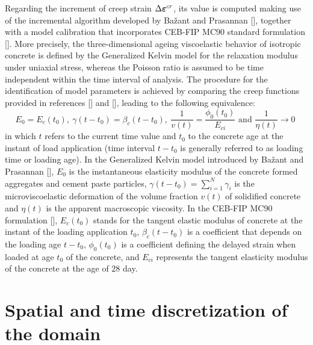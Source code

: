 \documentclass[a4paper,fleqn]{cas-sc}
\begin{document}
Regarding the increment of creep strain $\Delta \boldsymbol{\varepsilon}^{cr}$, its value is computed making use of the incremental algorithm developed by Bažant and Prasannan [], together with a model calibration that incorporates CEB-FIP MC90 standard formulation []. More precisely, the three-dimensional ageing viscoelastic behavior of isotropic concrete is defined by the Generalized Kelvin model for the relaxation modulus under uniaxial stress, whereas the Poisson ratio is assumed to be time independent within the time interval of analysis. The procedure for the identification of model parameters is achieved by comparing the creep functions provided in references [] and [], leading to the following equivalence:
\begin{equation} \label{eq:11}
	E_0 = E_c(t_0),~ \gamma(t-t_0)=\beta_c(t-t_0),~ \frac{1}{v(t)} = \frac{\phi_0(t_0)}{E_{ci}} \text{  and  } \frac{1}{\eta(t)} \to 0 \;
\end{equation}
in which $t$ refers to the current time value and $t_0$ to the concrete age at the instant of load application (time interval $t-t_0$ is generally referred to as loading time or loading age). In the Generalized Kelvin model introduced by Bažant and Prasannan [], $E_0$ is the instantaneous elasticity modulus of the concrete formed aggregates and cement paste particles, $\gamma(t-t_0) = \sum\limits_{i=1}^{N}\gamma_i$ is the microviscoelastic deformation of the volume fraction $v(t)$ of solidified concrete and $\eta(t)$ is the apparent macroscopic viscosity. In the CEB-FIP MC90 formulation [], $E_c(t_0)$ stands for the tangent elastic modulus of concrete at the instant of the loading application $t_0$, $\beta_c(t-t_0)$ is a coefficient that depends on the loading age $t-t_0$, $\phi_0(t_0)$ is a coefficient defining the delayed strain when loaded at age $t_0$ of the concrete, and $E_{ci}$ represents the tangent elasticity modulus of the concrete at the age of $28$ day.

\section{Spatial and time discretization of the domain}\label{section_spatial}
\end{document}
